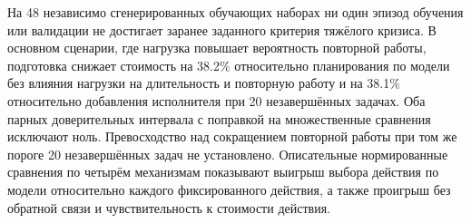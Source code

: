 На 48 независимо сгенерированных обучающих наборах ни один эпизод обучения или валидации не достигает заранее заданного критерия тяжёлого кризиса. В основном сценарии, где нагрузка повышает вероятность повторной работы, подготовка снижает стоимость на 38.2\% относительно планирования по модели без влияния нагрузки на длительность и повторную работу и на 38.1\% относительно добавления исполнителя при 20 незавершённых задачах. Оба парных доверительных интервала с поправкой на множественные сравнения исключают ноль. Превосходство над сокращением повторной работы при том же пороге 20 незавершённых задач не установлено. Описательные нормированные сравнения по четырём механизмам показывают выигрыш выбора действия по модели относительно каждого фиксированного действия, а также проигрыш без обратной связи и чувствительность к стоимости действия.
